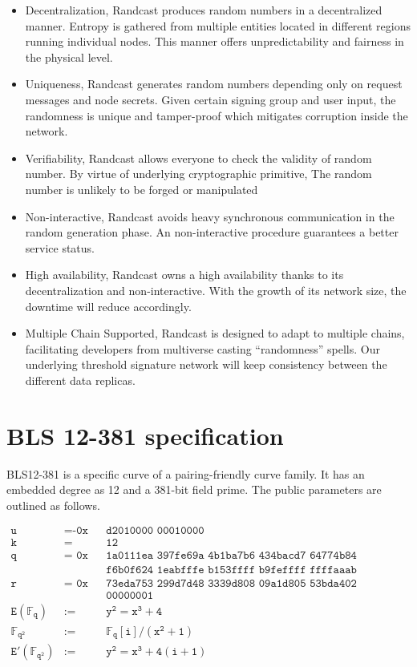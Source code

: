 \documentclass[11pt]{article}
\begin{document}
\begin{itemize}
    \item Decentralization, Randcast produces random numbers in a decentralized manner. Entropy is gathered from multiple entities located in different regions running individual nodes. This manner offers unpredictability and fairness in the physical level.
    \item Uniqueness, Randcast generates random numbers depending only on request messages and node secrets. Given certain signing group and user input, the randomness is unique and tamper-proof which mitigates corruption inside the network.
    \item Verifiability, Randcast allows everyone to check the validity of random number. By virtue of underlying cryptographic primitive, The random number is unlikely to be forged or manipulated
    \item Non-interactive, Randcast avoids heavy synchronous communication in the random generation phase. An non-interactive procedure guarantees a better service status.
    \item High availability, Randcast owns a high availability thanks to its decentralization and non-interactive. With the growth of its network size, the downtime will reduce accordingly.
    \item Multiple Chain Supported, Randcast is designed to adapt to multiple chains, facilitating developers from multiverse casting “randomness” spells. Our underlying threshold signature network will keep consistency between the different data replicas.
\end{itemize}

\appendix
\section{BLS 12-381 specification}
BLS12-381 is a specific curve of a pairing-friendly curve family. It has an embedded degree as 12 and a 381-bit field prime. The public parameters are outlined as follows\cite{sean2017bls}.

\begin{align*}
\texttt{u} &= \texttt{-0x} && \texttt{d2010000 00010000} \\
\texttt{k} &= &&\texttt{12} \\
\texttt{q} &= \texttt{ 0x} && \texttt{1a0111ea 397fe69a 4b1ba7b6 434bacd7 64774b84 f38512bf 6730d2a0} \\
& && \texttt{f6b0f624 1eabfffe b153ffff b9feffff ffffaaab} \\
\texttt{r} &= \texttt{ 0x} && \texttt{73eda753 299d7d48 3339d808 09a1d805 53bda402 fffe5bfe ffffffff}\\
& && \texttt{00000001} \\
\mathtt{E(\mathbb{F}_q)} &:= &&\mathtt{y^2 = x^3 + 4} \\
\mathtt{\mathbb{F}_{q^2}} &:= &&\mathtt{\mathbb{F}_q[i]/(x^2 + 1)} \\
\mathtt{E'(\mathbb{F}_{q^2})} &:= &&\mathtt{y^2 = x^3 + 4(i + 1)} \\
\end{align*}


\end{document}

